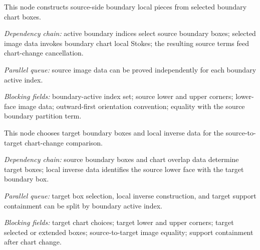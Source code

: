 \begin{definition}
  \label{obl:m7_boundary_source_piece_family}
  This node constructs source-side boundary local pieces from selected
  boundary chart boxes.

  \emph{Dependency chain:}
  active boundary indices select source boundary boxes; selected image data
  invokes boundary chart local Stokes; the resulting source terms feed
  chart-change cancellation.

  \emph{Parallel queue:}
  source image data can be proved independently for each boundary active
  index.

  \emph{Blocking fields:}
  boundary-active index set; source lower and upper corners; lower-face image
  data; outward-first orientation convention; equality with the source
  boundary partition term.
\end{definition}

\begin{definition}
  \label{obl:m7_boundary_target_image_boxes}
  This node chooses target boundary boxes and local inverse data for the
  source-to-target chart-change comparison.

  \emph{Dependency chain:}
  source boundary boxes and chart overlap data determine target boxes; local
  inverse data identifies the source lower face with the target boundary box.

  \emph{Parallel queue:}
  target box selection, local inverse construction, and target support
  containment can be split by boundary active index.

  \emph{Blocking fields:}
  target chart choices; target lower and upper corners; target selected or
  extended boxes; source-to-target image equality; support containment after
  chart change.
\end{definition}

